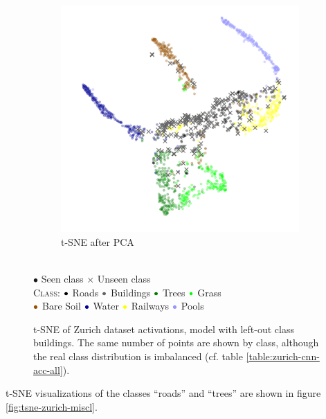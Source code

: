 \documentclass[10pt]{article}
\newcommand{\legendBullet}{
$\bullet$ Seen class $\times$ Unseen class\\
    \textsc{Class}: 
    ${\color{black}\bullet}$ Roads
    ${\color{buildings}\bullet}$ Buildings
    ${\color{trees}\bullet}$ Trees
    ${\color{grass}\bullet}$ Grass\\
    ${\color{baresoil}\bullet}$ Bare Soil
    ${\color{water}\bullet}$ Water
    ${\color{railways}\bullet}$ Railways
    ${\color{swimmingpools}\bullet}$ Pools
    }
\begin{document}
\begin{figure}[H]
\begin{subfigure}{.5\textwidth}
        \includegraphics[width=\textwidth]{t-SNE_wo_cl2_after_PCA}
        \caption{\gls{t-SNE} after \gls{PCA}}
    \end{subfigure}
    \\[.2cm]
    \legendBullet
    \caption{\gls{t-SNE} of Zurich dataset activations, model with left-out class buildings. The same number of points are shown by class, although the real class distribution is imbalanced (cf. table \ref{table:zurich-cnn-acc-all}).}
    \label{fig:tsne-zurich}
\end{figure}

\gls{t-SNE} visualizations of the classes ``roads'' and ``trees''  are shown in figure \ref{fig:tsne-zurich-miscl}.
\end{document}
